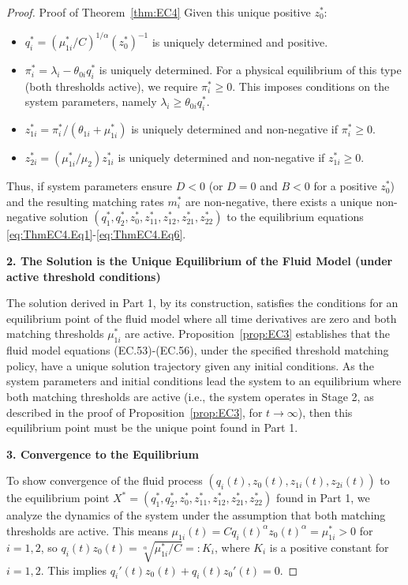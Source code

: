 \begin{proof}{Proof of Theorem~\ref{thm:EC4}}
Given this unique positive $z_0^*$:
\begin{itemize}
    \item $q_i^* = (\mu_{1i}^*/C)^{1/\alpha} (z_0^*)^{-1}$ is uniquely determined and positive.
    \item $\pi_i^* = \lambda_i - \theta_{0i}q_i^*$ is uniquely determined. For a physical equilibrium of this type (both thresholds active), we require $\pi_i^* \ge 0$. This imposes conditions on the system parameters, namely $\lambda_i \ge \theta_{0i}q_i^*$.
    \item $z_{1i}^* = \pi_i^*/(\theta_{1i} + \mu_{1i}^*)$ is uniquely determined and non-negative if $\pi_i^* \ge 0$.
    \item $z_{2i}^* = (\mu_{1i}^*/\mu_2)z_{1i}^*$ is uniquely determined and non-negative if $z_{1i}^* \ge 0$.
\end{itemize}
Thus, if system parameters ensure $D<0$ (or $D=0$ and $B<0$ for a positive $z_0^*$) and the resulting matching rates $m_i^*$ are non-negative, there exists a unique non-negative solution $(q_1^*, q_2^*, z_0^*, z_{11}^*, z_{12}^*, z_{21}^*, z_{22}^*)$ to the equilibrium equations \eqref{eq:ThmEC4.Eq1}-\eqref{eq:ThmEC4.Eq6}.

\textbf{2. The Solution is the Unique Equilibrium of the Fluid Model (under active threshold conditions)}

The solution derived in Part 1, by its construction, satisfies the conditions for an equilibrium point of the fluid model where all time derivatives are zero and both matching thresholds $\mu_{1i}^*$ are active.
Proposition~\ref{prop:EC3} establishes that the fluid model equations (EC.53)-(EC.56), under the specified threshold matching policy, have a unique solution trajectory given any initial conditions.
As the system parameters and initial conditions lead the system to an equilibrium where both matching thresholds are active (i.e., the system operates in Stage 2, as described in the proof of Proposition~\ref{prop:EC3}, for $t \to \infty$), then this equilibrium point must be the unique point found in Part 1.

\textbf{3. Convergence to the Equilibrium}

To show convergence of the fluid process $(q_i(t), z_0(t), z_{1i}(t), z_{2i}(t))$ to the equilibrium point $X^* = (q_1^*, q_2^*, z_0^*, z_{11}^*, z_{12}^*, z_{21}^*, z_{22}^*)$ found in Part 1, we analyze the dynamics of the system under the assumption that both matching thresholds are active.
This means $\mu_{1i}(t) = C q_i(t)^{\alpha} z_0(t)^{\alpha} = \mu_{1i}^* > 0$ for $i=1,2$, so $q_i(t)z_0(t) = \sqrt[\alpha]{\mu_{1i}^*/C} =: K_i$, where $K_i$ is a positive constant for $i=1,2$.
This implies $q_i'(t)z_0(t) + q_i(t)z_0'(t) = 0$.


\end{proof}

